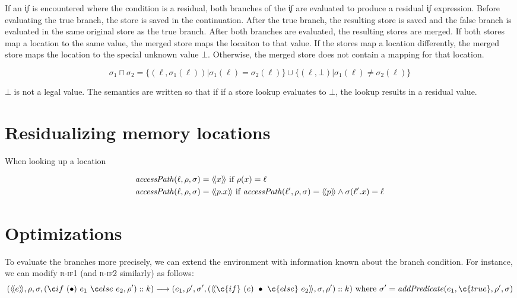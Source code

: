 If an \c{if} is encountered where the condition is a residual,
both branches of the \c{if} are evaluated to produce a residual
\c{if} expression.
Before evaluating the true branch, the 
store is saved in the continuation.
After the true branch, the resulting store is saved and
the false branch is evaluated in the same original store
as the true branch.
After both branches are evaluated, the resulting stores
are merged. If both stores map a location to the same
value, the merged store maps the locaiton to that value. If the stores
map a location differently, the merged store maps the location
to the special unknown value $\bot$. 
Otherwise, the merged store does not contain a mapping for that location.

\[
  \sigma_1 \sqcap \sigma_2
         = \{ (\ell, \sigma_1(\ell)) |
                \sigma_1(\ell) = 
                \sigma_2(\ell) 
                \}
         \cup
           \{ (\ell, \bot) |
                \sigma_1(\ell) \not= \sigma_2(\ell)
                \}
\]

$\bot$ is not a legal value.
The semantics are written so that if
if a store lookup evaluates to $\bot$, the lookup results
in a residual value.

\section{Residualizing memory locations}

When looking up a location

\begin{align*}
  \mathit{accessPath}(\ell, \rho, \sigma) &= \langle\!\langle{x}\rangle\!\rangle ~\mbox{if}~\rho(x) = \ell \\ 
  \mathit{accessPath}(\ell, \rho, \sigma) &= \langle\!\langle{p.x}\rangle\!\rangle
        ~\mbox{if}~
  \mathit{accessPath}(\ell', \rho, \sigma) = \langle\!\langle{p}\rangle\!\rangle
  \wedge
  \sigma(\ell'.x) = \ell \\
\end{align*}

\section{Optimizations}

To evaluate the branches more precisely, we can extend the environment
with information known about the branch condition.
For instance, 
we can modify \textsc{r-if1} (and \textsc{r-if2} similarly) as follows:
  \[
    (\residual{e}, \rho, \sigma, \branch{e_1}{e_2}{\rho'}::k)
    \longrightarrow
    (e_1, \rho', \sigma', (\residual{\c{if}~(e)~\bullet~\c{else}~e_2}, \sigma, \rho')::k)
        ~\mbox{where}~\sigma' = \mathit{addPredicate}(e_1, \c{true}, \rho', \sigma)
      \]

